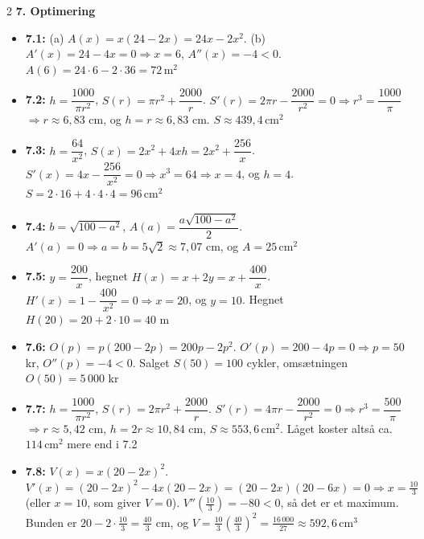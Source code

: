 \documentclass[11pt,a4paper]{article}
\begin{document}
\begin{multicols}{2}
\noindent\textbf{7. Optimering}
\begin{itemize}[leftmargin=1.3em, itemsep=1pt, topsep=2pt]
  \item \textbf{7.1:} (a) $A(x) = x(24-2x) = 24x - 2x^{2}$.
        (b) $A'(x) = 24-4x = 0 \Rightarrow x = 6$,
        $A''(x) = -4 < 0$. $A(6) = 24\cdot 6 - 2\cdot 36 = 72\,\text{m}^{2}$
  \item \textbf{7.2:} $h = \dfrac{1000}{\pi r^{2}}$,
        $S(r) = \pi r^{2} + \dfrac{2000}{r}$.
        $S'(r) = 2\pi r - \dfrac{2000}{r^{2}} = 0 \Rightarrow r^{3} = \dfrac{1000}{\pi}$
        $\Rightarrow r \approx 6{,}83$ cm, og $h = r \approx 6{,}83$ cm.
        $S \approx 439{,}4\,\text{cm}^{2}$
  \item \textbf{7.3:} $h = \dfrac{64}{x^{2}}$,
        $S(x) = 2x^{2} + 4xh = 2x^{2} + \dfrac{256}{x}$.
        $S'(x) = 4x - \dfrac{256}{x^{2}} = 0 \Rightarrow x^{3} = 64
        \Rightarrow x = 4$, og $h = 4$. $S = 2\cdot 16 + 4\cdot 4\cdot 4
        = 96\,\text{cm}^{2}$
  \item \textbf{7.4:} $b = \sqrt{100-a^{2}}$, $A(a) = \dfrac{a\sqrt{100-a^{2}}}{2}$.
        $A'(a) = 0 \Rightarrow a = b = 5\sqrt{2} \approx 7{,}07$ cm,
        og $A = 25\,\text{cm}^{2}$
  \item \textbf{7.5:} $y = \dfrac{200}{x}$, hegnet $H(x) = x + 2y = x + \dfrac{400}{x}$.
        $H'(x) = 1 - \dfrac{400}{x^{2}} = 0 \Rightarrow x = 20$,
        og $y = 10$. Hegnet $H(20) = 20 + 2\cdot 10 = 40$ m
  \item \textbf{7.6:} $O(p) = p(200-2p) = 200p - 2p^{2}$.
        $O'(p) = 200 - 4p = 0 \Rightarrow p = 50$ kr,
        $O''(p) = -4 < 0$. Salget $S(50) = 100$ cykler,
        omsætningen $O(50) = 5\,000$ kr
  \item \textbf{7.7:} $h = \dfrac{1000}{\pi r^{2}}$,
        $S(r) = 2\pi r^{2} + \dfrac{2000}{r}$.
        $S'(r) = 4\pi r - \dfrac{2000}{r^{2}} = 0 \Rightarrow r^{3} = \dfrac{500}{\pi}$
        $\Rightarrow r \approx 5{,}42$ cm, $h = 2r \approx 10{,}84$ cm,
        $S \approx 553{,}6\,\text{cm}^{2}$.
        Låget koster altså ca. $114\,\text{cm}^{2}$ mere end i 7.2
  \item \textbf{7.8:} $V(x) = x(20-2x)^{2}$.
        $V'(x) = (20-2x)^{2} - 4x(20-2x) = (20-2x)(20-6x) = 0
        \Rightarrow x = \tfrac{10}{3}$ (eller $x = 10$, som giver
        $V = 0$). $V''(\tfrac{10}{3}) = -80 < 0$, så det er et maximum.
        Bunden er $20 - 2\cdot\tfrac{10}{3} = \tfrac{40}{3}$ cm, og
        $V = \tfrac{10}{3}\left(\tfrac{40}{3}\right)^{2}
        = \tfrac{16\,000}{27} \approx 592{,}6\,\text{cm}^{3}$
\end{itemize}


\end{multicols}
\end{document}
